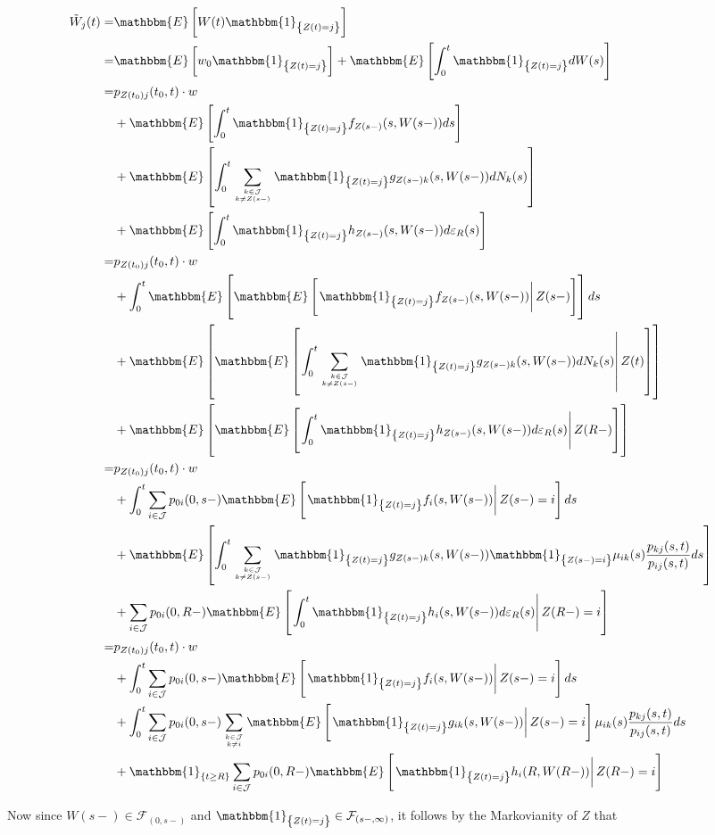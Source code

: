\documentclass{article}
\newcommand{\1}[1]{\mathbbm{1}_{\left\lbrace #1 \right\rbrace}}
\newcommand{\expec}[1][def]{\mathbbm{E} \left[ #1 \right]}
\newcommand{\econd}[2][def]{\mathbbm{E} \left[ \left. #1 \right| #2 \right]}
\theoremstyle{break}
\theoremstyle{remark}
\numberwithin{equation}{section}
\begin{document}
\begin{appendices}
\begin{align*}
    \tilde{W}_j(t) =& \expec[W(t) \1{Z(t)=j}] \\
    =& \expec[w_0 \1{Z(t)=j}] + \expec[\int_0^t \1{Z(t)=j} dW(s)] \\
    =& p_{Z(t_0)j}(t_0,t) \cdot w \\
    &+ \expec[\int_0^t \1{Z(t)=j} f_{Z(s-)}(s,W(s-)) ds] \\
    &+ \expec[\int_0^t \sum_{k \in \mathcal{J} \atop k \neq Z(s-)} \1{Z(t)=j} g_{Z(s-)k}(s,W(s-)) dN_k(s)] \\
    &+ \expec[\int_0^t \1{Z(t)=j} h_{Z(s-)}(s,W(s-)) d \varepsilon_{R}(s)] \\
    =& p_{Z(t_0)j}(t_0,t) \cdot w \\
    &+ \int_0^t \mathbbm{E} \left[ \econd[\1{Z(t)=j} f_{Z(s-)}(s,W(s-))]{Z(s-)} \right] ds \\
    &+ \mathbbm{E} \left[ \econd[ \int_0^t \sum_{k \in \mathcal{J} \atop k \neq Z(s-)} \1{Z(t)=j} g_{Z(s-)k}(s,W(s-)) dN_k(s)]{Z(t)} \right] \\
    &+ \mathbbm{E} \left[ \econd[\int_0^t \1{Z(t)=j} h_{Z(s-)}(s,W(s-)) d \varepsilon_{R}(s)]{Z(R-)} \right] \\
    =& p_{Z(t_0)j}(t_0,t) \cdot w \\
    &+ \int_0^t \sum_{i \in \mathcal{J}} p_{0i}(0,s-) \econd[\1{Z(t)=j} f_{i}(s,W(s-))]{Z(s-)=i} ds \\
    &+ \expec[ \int_0^t \sum_{k \in \mathcal{J} \atop k \neq Z(s-)} \1{Z(t)=j} g_{Z(s-)k}(s,W(s-)) \1{Z(s-)=i} \mu_{ik}(s) \frac{p_{kj}(s,t)}{p_{ij}(s,t)} ds] \\
    &+ \sum_{i \in \mathcal{J}} p_{0i}(0,R-) \econd[\int_0^t \1{Z(t)=j} h_{i}(s,W(s-)) d \varepsilon_{R}(s)]{Z(R-)=i} \\
    =& p_{Z(t_0)j}(t_0,t) \cdot w \\
    &+ \int_0^t \sum_{i \in \mathcal{J}} p_{0i}(0,s-) \econd[\1{Z(t)=j} f_{i}(s,W(s-))]{Z(s-)=i} ds \\
    &+ \int_0^t \sum_{i \in \mathcal{J}} p_{0i}(0,s-) \sum_{k \in \mathcal{J} \atop k \neq i} \econd[\1{Z(t)=j} g_{ik}(s,W(s-))]{Z(s-)=i} \mu_{ik}(s) \frac{p_{kj}(s,t)}{p_{ij}(s,t)} ds \\
    &+ \1{t \geq R} \sum_{i \in \mathcal{J}} p_{0i}(0,R-) \econd[\1{Z(t)=j} h_{i}(R,W(R-))]{Z(R-)=i} \\
\end{align*}

Now since $W(s-) \in  \mathcal{F}_{\left( 0,s- \right)}$ and $\1{Z(t)=j} \in \mathcal{F}_{\left( s-,\infty \right)}$, it follows by the Markovianity of $Z$ that


\end{appendices}
\end{document}
